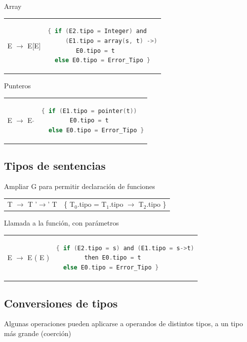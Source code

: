 \documentclass[12pt, twoside, openright]{report} %
\begin{document}
Array
\begin{table}[H]
\begin{tabular}{ll}
E $\rightarrow$ E[E] & 
\textbf{ } \begin{lstlisting}[language=C]
{ if (E2.tipo = Integer) and
     (E1.tipo = array(s, t) ->)
        E0.tipo = t
  else E0.tipo = Error_Tipo }
\end{lstlisting} \\
\end{tabular}
\end{table}

Punteros
\begin{table}[H]
\begin{tabular}{ll}
E $\rightarrow$ E $\hat{}$ & 
\textbf{ } \begin{lstlisting}[language=C]
{ if (E1.tipo = pointer(t))
        E0.tipo = t
  else E0.tipo = Error_Tipo }
\end{lstlisting} \\
\end{tabular}
\end{table}

\subsection{Tipos de sentencias}
Ampliar G para permitir declaración de funciones
\begin{table}[H]
\begin{tabular}{ll}
T $\rightarrow$ T '$\rightarrow$' T & \{ T$_0$.tipo = T$_1$.tipo $\rightarrow$ T$_2$.tipo \} \\
\end{tabular}
\end{table}

Llamada a la función, con parámetros
\begin{table}[H]
\begin{tabular}{ll}
E $\rightarrow$ E ( E ) & 
\textbf{ } \begin{lstlisting}[language=C]
{ if (E2.tipo = s) and (E1.tipo = s->t)
        then E0.tipo = t
  else E0.tipo = Error_Tipo }
\end{lstlisting} \\
\end{tabular}
\end{table}

\subsection{Conversiones de tipos}
Algunas operaciones pueden aplicarse a operandos de distintos tipos, a un tipo más grande  (coerción)
\end{document}
